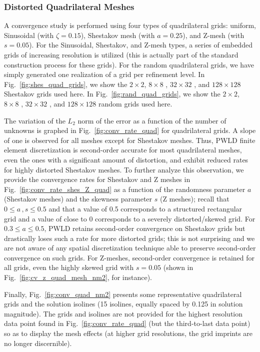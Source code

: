 \documentclass[preprint,10pt]{elsarticle}
\newcommand{\fig}[1]{Fig.~\ref{#1}}                      %
\begin{document}
\subsubsection{Distorted Quadrilateral Meshes} \label{sec:results_conv_quad}

A convergence study is performed using four types of quadrilateral grids: uniform, Sinusoidal (with $\zeta=0.15$), Shestakov mesh (with $a=0.25$), and Z-mesh (with $s=0.05$).
For the Sinusoidal, Shestakov, and Z-mesh types, a series of embedded grids of increasing resolution is utilized (this is actually part of the standard construction process for these grids). For the random quadrilateral grids, we have simply generated one realization of a grid per refinement level.  In \fig{fig:shes_quad_grids}, we show the $2 \times 2$, $8 \times 8$ , $32 \times 32$ , and $128\times 128$ Shestakov grids used here. 
 In \fig{fig:rand_quad_grids}, we show the $2 \times 2$, $8 \times 8$ , $32 \times 32$ , and $128\times 128$ random grids used here. 

The  variation of the $L_2$ norm of the error as a function of the number of unknowns is graphed in \fig{fig:conv_rate_quad} for quadrilateral grids. A slope of one is observed for all meshes except for Shestakov meshes. Thus, PWLD finite element discretization is second-order accurate for most quadrilateral meshes, even the ones with a significant amount of distortion, and exhibit reduced rates for highly distorted Shestakov meshes.
To further analyze this observation, we provide the convergence rates for Shestakov and Z meshes in \fig{fig:conv_rate_shes_Z_quad} as a function of the randomness parameter $a$ (Shestakov meshes) and the skewness parameter $s$ (Z meshes); recall that $0 \le a\, , s \le 0.5$ and that a value of 0.5 corresponds to a structured rectangular grid and a value of close to 0 corresponds to a severely distorted/skewed grid. For $0.3 \le a \le 0.5$, PWLD retains second-order convergence on Shestakov grids but drastically loses such a rate for more distorted grids; this is not surprising and we are not aware of any spatial discretization technique able to preserve second-order convergence on such grids. For Z-meshes, second-order convergence is retained for all grids, even the highly skewed grid with $s=0.05$ (shown in \fig{fig:cv_z_quad_mesh_nm2}, for instance).

Finally, \fig{fig:conv_quad_nm2} presents some representative quadrilateral grids and the solution isolines (15 isolines, equally spaced by 0.125 in solution magnitude). The grids and isolines are not provided for the highest resolution data point found in \fig{fig:conv_rate_quad} (but the third-to-last data point) so as to display the mesh effects (at higher grid resolutions, the grid imprints are no longer discernible).
\end{document}
